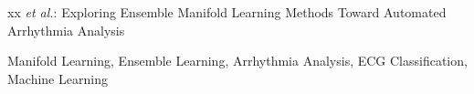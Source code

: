 \documentclass[journal]{IEEEtran}
\begin{document}
\markboth{}%
{xx \MakeLowercase{\textit{et al.}}: Exploring Ensemble Manifold Learning Methods Toward Automated Arrhythmia Analysis}
% 











\maketitle

\begin{abstract}
\lipsum[1-2]
\end{abstract}

\begin{IEEEkeywords}
Manifold Learning, Ensemble Learning, Arrhythmia Analysis, ECG Classification, Machine Learning
\end{IEEEkeywords}






%
\IEEEpeerreviewmaketitle
\end{document}

